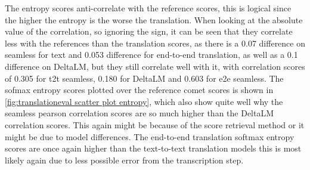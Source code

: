 The entropy scores anti-correlate with the reference scores, this is logical since the higher the entropy is the worse the translation. 
When looking at the absolute value of the correlation, so ignoring the sign, it can be seen that they correlate less with the references than the translation scores, as there is a 0.07 difference on seamless for text and 0.053 difference for end-to-end translation, as well as a 0.1 difference on DeltaLM, but they still correlate well with it, with correlation scores of 0.305 for t2t seamless, 0.180 for DeltaLM and 0.603 for e2e seamless.
The sofmax entropy scores plotted over the reference comet scores is shown in \autoref{fig:translationeval scatter plot entropy}, which also show quite well why the seamless pearson correlation scores are so much higher than the DeltaLM correlation scores. This again might be because of the score retrieval method or it might be due to model differences. 
The end-to-end translation softmax entropy scores are once again higher than the text-to-text translation models this is most likely again due to less possible error from the transcription step.
